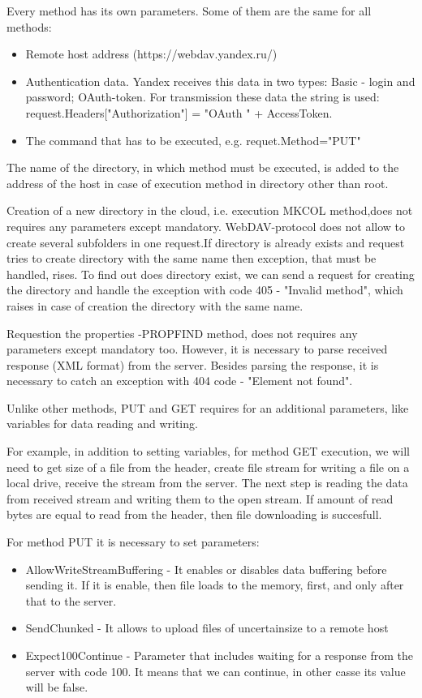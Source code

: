 \documentclass[12pt,journal,compsoc]{D:/Магистратура/English/bare_conf/IEEEtran}
\begin{document}
Every method has its own parameters. Some of them are the same for all methods:
\begin{itemize}
\item Remote host address (https://webdav.yandex.ru/)
\item Authentication data. Yandex receives this data in two types: Basic - login and password; OAuth-token. For transmission these data the string is used: request.Headers["Authorization"] = "OAuth " + AccessToken.
\item The command that has to be executed, e.g. requet.Method="PUT"
\end{itemize}

The name of the directory, in which method must be executed, is added to the address of the host in case of execution method in directory other than root.

Creation of a new directory in the cloud, i.e. execution MKCOL method,does not requires any parameters except mandatory. WebDAV-protocol does not allow to create several subfolders in one request.If directory is already exists and request tries to create directory with the same name then exception, that must be handled, rises. To find out does directory exist, we can send a request for creating the directory and handle the exception with code 405 - "Invalid method", which raises in case of creation the directory with the same name.

Requestion the properties -PROPFIND method, does not requires any parameters except mandatory too. However, it is necessary to parse received response (XML format) from the server. Besides parsing the response, it is necessary to catch an exception with 404 code - "Element not found".

Unlike other methods, PUT and GET requires for an additional parameters, like variables for data reading and writing.

For example, in addition to setting variables, for method GET execution, we will need to get size of a file from the header, create file stream for writing a file on a local drive, receive the stream from the server. The next step is reading the data from received stream and writing them to the open stream. If amount of read bytes are equal to read from the header, then file downloading is succesfull.

For method PUT it is necessary to set parameters:
 \begin{itemize}
\item AllowWriteStreamBuffering - It enables or disables data buffering before sending it. If it is enable, then file loads to the memory, first, and only after that to the server.
\item SendChunked - It allows to upload files of uncertainsize to a remote host 
\item Expect100Continue - Parameter that includes waiting for a response from the server with code 100. It means that we can continue, in other casse its value will be false.
\end{itemize}
\end{document}
